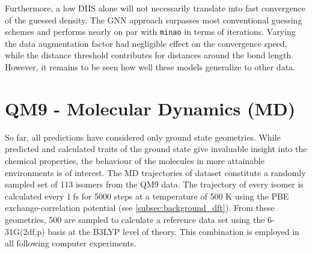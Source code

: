 Furthermore, a low DIIS alone will not necessarily translate into fast convergence of the guessed density. The GNN approach surpasses most conventional guessing schemes and performs nearly on par with \texttt{minao} in terms of iterations. Varying the data augmentation factor had negligible effect on the convergence speed, while the distance threshold contributes for distances around the bond length. However, it remains to be seen how well these models generalize to other data. 

\section{QM9 -  Molecular Dynamics (MD)}
\label{sec:qm9_md_isomers_benchmark}
So far, all predictions have considered only ground state geometries. While predicted and calculated traits of the ground state give invaluable insight into the chemical properties, the behaviour of the molecules in more attainable environments is of interest. The MD trajectories of  dataset \parencite{ref:qm9_isomers_md} constitute a randomly sampled set of 113 isomers from the QM9  data. The trajectory of every isomer is calculated every $\SI{1}{\femto\second}$ for 5000 steps at a temperature of 500 K using the PBE exchange-correlation potential (see \ref{subsec:background_dft}). From these geometries, 500 are sampled to calculate a reference data set using the 6-31G(2df,p) basis at the B3LYP level of theory. This combination is employed in all following computer experiments. 
\newpage
